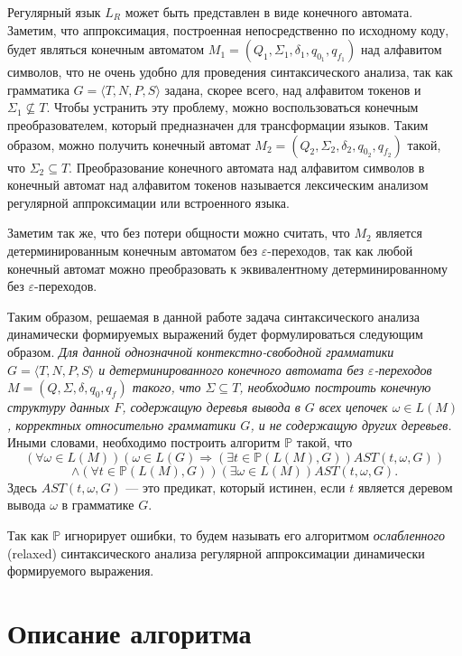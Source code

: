 Регулярный язык $L_R$ может быть представлен в виде конечного автомата. Заметим, что аппроксимация, построенная непосредственно по исходному коду, будет являться конечным автоматом $M_1=(Q_1,\Sigma_1,\delta_1,q_{0_1},q_{f_1})$ над алфавитом символов, что не очень удобно для проведения синтаксического анализа, так как грамматика $G = \langle T, N, P, S \rangle$ задана, скорее всего, над алфавитом токенов и $\Sigma_1 \nsubseteq T$. Чтобы устранить эту проблему, можно воспользоваться конечным преобразователем, который предназначен для трансформации языков. Таким образом, можно получить конечный автомат $M_2=(Q_2,\Sigma_2,\delta_2,q_{0_2},q_{f_2})$ такой, что $\Sigma_2 \subseteq T$. Преобразование конечного автомата над алфавитом символов в конечный автомат над алфавитом токенов называется лексическим анализом регулярной аппроксимации или встроенного языка.

Заметим так же, что без потери общности можно считать, что $M_2$ является детерминированным конечным автоматом без $\varepsilon$-переходов, так как любой конечный автомат можно преобразовать к эквивалентному детерминированному без  $\varepsilon$-переходов.

Таким образом, решаемая в данной работе задача синтаксического анализа динамически формируемых выражений будет формулироваться следующим образом. \textit{ Для данной однозначной контекстно-свободной грамматики $G = \langle T, N, P, S \rangle$ и детерминированного конечного автомата без $\varepsilon$-переходов $M=(Q,\Sigma,\delta,q_0,q_f)$ такого, что $\Sigma \subseteq T$, необходимо построить конечную структуру данных $F$, содержащую деревья вывода в $G$ всех цепочек $\omega \in L(M)$, корректных относительно грамматики $G$, и не содержащую других деревьев. } Иными словами, необходимо построить алгоритм $\mathbb{P}$ такой, что
    $$(\forall \omega \in L(M)) (\omega \in L(G) \Rightarrow (\exists t \in \mathbb{P}(L(M),G))AST(t, \omega, G))$$
    $$\land (\forall t \in \mathbb{P}(L(M),G))(\exists \omega \in L(M))AST(t,\omega,G).$$ 
    Здесь $AST(t,\omega,G)$ --- это предикат, который истинен, если $t$ является деревом вывода $\omega$ в грамматике $G$.


Так как $\mathbb{P}$ игнорирует ошибки, то будем называть его алгоритмом \textit{ослабленного} (relaxed) синтаксического анализа регулярной аппроксимации динамически формируемого выражения.


\section{Описание алгоритма}\label{AlgoDescr}

